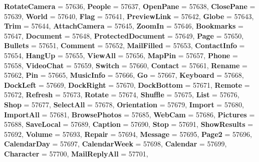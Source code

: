 \begin{DoxyCompactItemize}
\newline
{\bfseries Rotate\+Camera} = 57636, 
{\bfseries People} = 57637, 
{\bfseries Open\+Pane} = 57638, 
{\bfseries Close\+Pane} = 57639, 
\newline
{\bfseries World} = 57640, 
{\bfseries Flag} = 57641, 
{\bfseries Preview\+Link} = 57642, 
{\bfseries Globe} = 57643, 
\newline
{\bfseries Trim} = 57644, 
{\bfseries Attach\+Camera} = 57645, 
{\bfseries Zoom\+In} = 57646, 
{\bfseries Bookmarks} = 57647, 
\newline
{\bfseries Document} = 57648, 
{\bfseries Protected\+Document} = 57649, 
{\bfseries Page} = 57650, 
{\bfseries Bullets} = 57651, 
\newline
{\bfseries Comment} = 57652, 
{\bfseries Mail\+Filled} = 57653, 
{\bfseries Contact\+Info} = 57654, 
{\bfseries Hang\+Up} = 57655, 
\newline
{\bfseries View\+All} = 57656, 
{\bfseries Map\+Pin} = 57657, 
{\bfseries Phone} = 57658, 
{\bfseries Video\+Chat} = 57659, 
\newline
{\bfseries Switch} = 57660, 
{\bfseries Contact} = 57661, 
{\bfseries Rename} = 57662, 
{\bfseries Pin} = 57665, 
\newline
{\bfseries Music\+Info} = 57666, 
{\bfseries Go} = 57667, 
{\bfseries Keyboard} = 57668, 
{\bfseries Dock\+Left} = 57669, 
\newline
{\bfseries Dock\+Right} = 57670, 
{\bfseries Dock\+Bottom} = 57671, 
{\bfseries Remote} = 57672, 
{\bfseries Refresh} = 57673, 
\newline
{\bfseries Rotate} = 57674, 
{\bfseries Shuffle} = 57675, 
{\bfseries List} = 57676, 
{\bfseries Shop} = 57677, 
\newline
{\bfseries Select\+All} = 57678, 
{\bfseries Orientation} = 57679, 
{\bfseries Import} = 57680, 
{\bfseries Import\+All} = 57681, 
\newline
{\bfseries Browse\+Photos} = 57685, 
{\bfseries Web\+Cam} = 57686, 
{\bfseries Pictures} = 57688, 
{\bfseries Save\+Local} = 57689, 
\newline
{\bfseries Caption} = 57690, 
{\bfseries Stop} = 57691, 
{\bfseries Show\+Results} = 57692, 
{\bfseries Volume} = 57693, 
\newline
{\bfseries Repair} = 57694, 
{\bfseries Message} = 57695, 
{\bfseries Page2} = 57696, 
{\bfseries Calendar\+Day} = 57697, 
\newline
{\bfseries Calendar\+Week} = 57698, 
{\bfseries Calendar} = 57699, 
{\bfseries Character} = 57700, 
{\bfseries Mail\+Reply\+All} = 57701, 

\end{DoxyCompactItemize}
